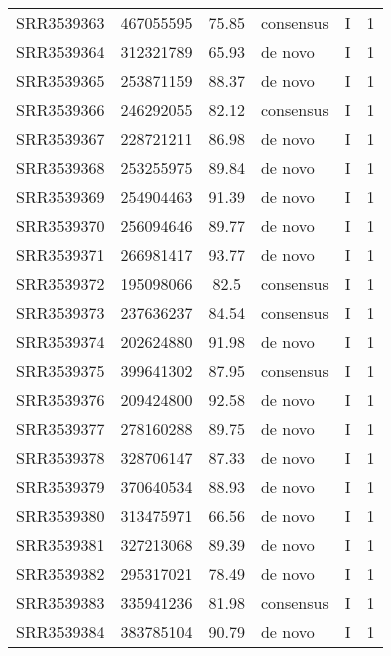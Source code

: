 \begin{scriptsize}
\begin{center}
\begin{longtable}{@{}lcclcc@{}}
SRR3539363 & 467055595     & 75.85       & consensus    & I        & 1        \\
SRR3539364 & 312321789     & 65.93       & de novo      & I        & 1        \\
SRR3539365 & 253871159     & 88.37       & de novo      & I        & 1        \\
SRR3539366 & 246292055     & 82.12       & consensus    & I        & 1        \\
SRR3539367 & 228721211     & 86.98       & de novo      & I        & 1        \\
SRR3539368 & 253255975     & 89.84       & de novo      & I        & 1        \\
SRR3539369 & 254904463     & 91.39       & de novo      & I        & 1        \\
SRR3539370 & 256094646     & 89.77       & de novo      & I        & 1        \\
SRR3539371 & 266981417     & 93.77       & de novo      & I        & 1        \\
SRR3539372 & 195098066     & 82.5        & consensus    & I        & 1        \\
SRR3539373 & 237636237     & 84.54       & consensus    & I        & 1        \\
SRR3539374 & 202624880     & 91.98       & de novo      & I        & 1        \\
SRR3539375 & 399641302     & 87.95       & consensus    & I        & 1        \\
SRR3539376 & 209424800     & 92.58       & de novo      & I        & 1        \\
SRR3539377 & 278160288     & 89.75       & de novo      & I        & 1        \\
SRR3539378 & 328706147     & 87.33       & de novo      & I        & 1        \\
SRR3539379 & 370640534     & 88.93       & de novo      & I        & 1        \\
SRR3539380 & 313475971     & 66.56       & de novo      & I        & 1        \\
SRR3539381 & 327213068     & 89.39       & de novo      & I        & 1        \\
SRR3539382 & 295317021     & 78.49       & de novo      & I        & 1        \\
SRR3539383 & 335941236     & 81.98       & consensus    & I        & 1        \\
SRR3539384 & 383785104     & 90.79       & de novo      & I        & 1        \\

\end{longtable}
\end{center}
\end{scriptsize}

